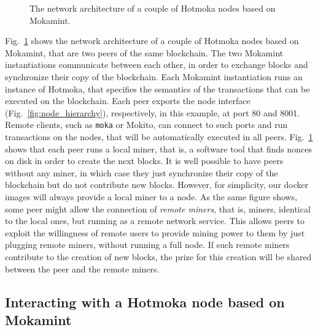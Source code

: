 \begin{figure}[th]
\begin{center}
  \end{center}
  \caption{The network architecture of a couple of Hotmoka nodes based on Mokamint.}\label{fig:hotmoka_mokamint_network}
\end{figure}

Fig.~\ref{fig:hotmoka_mokamint_network} shows the network architecture of a couple
of Hotmoka nodes based on Mokamint, that are two peers of the same blockchain. The two Mokamint instantiations
communicate between each other, in order to exchange blocks and synchronize their copy of the blockchain.
Each Mokamint instantiation runs an instance of Hotmoka, that specifies the semantics of the transactions
that can be executed on the blockchain. Each peer exports the node interface (Fig.~\ref{fig:node_hierarchy}),
respectively, in this example, at port 80 and 8001. Remote clients, such as \texttt{moka} or Mokito, can connect to such
ports and run transactions on the nodes, that will be automatically executed in all peers.
Fig.~\ref{fig:hotmoka_mokamint_network} shows that each peer runs a local miner, that is, a software
tool that finds nonces on disk in order to create the next blocks. It is well possible to have peers
without any miner, in which case they just synchronize their copy of the blockchain but do not contribute
new blocks. However, for simplicity, our docker images will always provide a local miner to a node.
As the same figure shows,
some peer might allow the connection of \emph{remote miners},
that is, miners, identical to the local ones,
but running as a remote network service. This allows peers to exploit the willingness of remote users
to provide mining power to them by just plugging remote miners, without running a full node. If such remote miners
contribute to the creation of new blocks,
the prize for this creation will be shared between the peer and the remote miners.

\subsection{Interacting with a Hotmoka node based on Mokamint}\label{subsec:interacting_mokamint}

